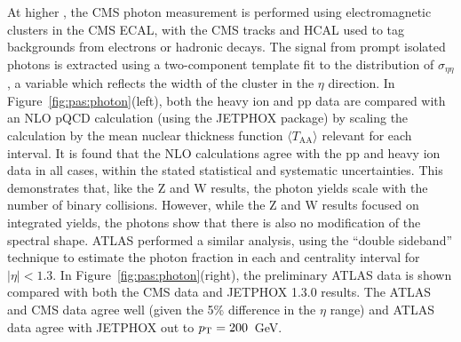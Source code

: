 At higher \pT, 
the CMS photon measurement is performed using electromagnetic clusters in the CMS ECAL, with the
CMS tracks and HCAL used to tag backgrounds from electrons or hadronic decays.
The signal from prompt isolated photons is extracted using a two-component template fit to
the distribution of $\sigma_{\eta\eta}$, a variable which reflects the width of the cluster
in the $\eta$ direction.  
In Figure~\ref{fig:pas:photon}(left),
both the heavy ion and pp data are compared with an NLO pQCD calculation (using the
JETPHOX package) by scaling the calculation by the mean nuclear
thickness function $\langle T_{\mathrm{AA}} \rangle$ relevant for each interval.
It is found that the NLO calculations agree with the pp and heavy ion data in all cases, within
the stated statistical and systematic uncertainties.  This demonstrates that, like the
Z and W results, the photon yields scale with the number of binary collisions.
However, while the Z and W results focused on integrated yields, the photons show that
there is also no modification of the spectral shape.
ATLAS performed a similar analysis, using the ``double sideband'' technique to estimate the
photon fraction in each \pT and centrality interval for $|\eta|<1.3$.
In Figure~\ref{fig:pas:photon}(right), the preliminary ATLAS data is shown compared with both
the CMS data and JETPHOX 1.3.0 results.  The ATLAS and CMS data agree well (given the 5\%
difference in the $\eta$ range) and ATLAS data agree with JETPHOX out to $\mbox{$p_{\mathrm{T}}$} = 200$~GeV.

